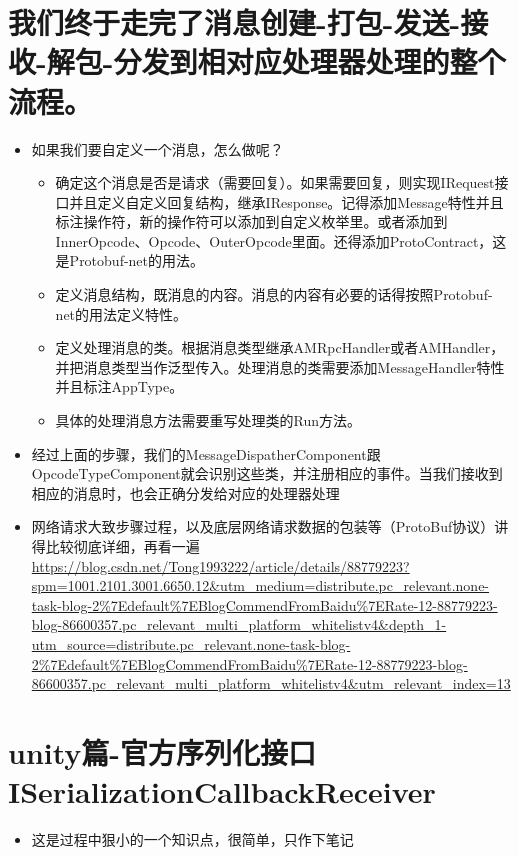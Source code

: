 \documentclass[9pt, b5paper]{article}
\begin{document}
\section{我们终于走完了消息创建-打包-发送-接收-解包-分发到相对应处理器处理的整个流程。}
\label{sec-30}
\begin{itemize}
\item 如果我们要自定义一个消息，怎么做呢？
\begin{itemize}
\item 确定这个消息是否是请求（需要回复）。如果需要回复，则实现IRequest接口并且定义自定义回复结构，继承IResponse。记得添加Message特性并且标注操作符，新的操作符可以添加到自定义枚举里。或者添加到InnerOpcode、Opcode、OuterOpcode里面。还得添加ProtoContract，这是Protobuf-net的用法。
\item 定义消息结构，既消息的内容。消息的内容有必要的话得按照Protobuf-net的用法定义特性。
\item 定义处理消息的类。根据消息类型继承AMRpcHandler或者AMHandler，并把消息类型当作泛型传入。处理消息的类需要添加MessageHandler特性并且标注AppType。
\item 具体的处理消息方法需要重写处理类的Run方法。
\end{itemize}
\item 经过上面的步骤，我们的MessageDispatherComponent跟OpcodeTypeComponent就会识别这些类，并注册相应的事件。当我们接收到相应的消息时，也会正确分发给对应的处理器处理
\item 网络请求大致步骤过程，以及底层网络请求数据的包装等（ProtoBuf协议）讲得比较彻底详细，再看一遍\url{https://blog.csdn.net/Tong1993222/article/details/88779223?spm=1001.2101.3001.6650.12&utm_medium=distribute.pc_relevant.none-task-blog-2\%7Edefault\%7EBlogCommendFromBaidu\%7ERate-12-88779223-blog-86600357.pc_relevant_multi_platform_whitelistv4&depth_1-utm_source=distribute.pc_relevant.none-task-blog-2\%7Edefault\%7EBlogCommendFromBaidu\%7ERate-12-88779223-blog-86600357.pc_relevant_multi_platform_whitelistv4&utm_relevant_index=13}
\end{itemize}
\section{unity篇-官方序列化接口 ISerializationCallbackReceiver}
\label{sec-31}
\begin{itemize}
\item 这是过程中狠小的一个知识点，很简单，只作下笔记　
\end{itemize}
\end{document}
